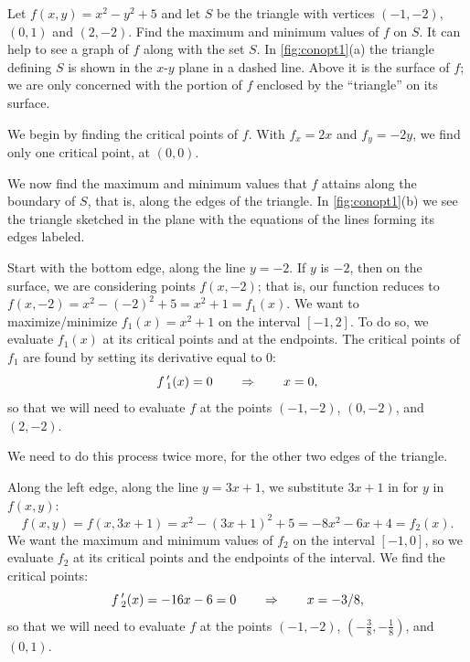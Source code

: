\begin{example}\label{ex_conopt1}%
Let $f(x,y) = x^2-y^2+5$ and let $S$ be the triangle with vertices $(-1,-2)$, $(0,1)$ and $(2,-2)$. Find the maximum and minimum values of $f$ on $S$.
\solution
It can help to see a graph of $f$ along with the set $S$. In \autoref{fig:conopt1}(a) the triangle defining $S$ is shown in the $x$-$y$ plane in a dashed line. Above it is the surface of $f$; we are only concerned with the portion of $f$ enclosed by the ``triangle'' on its surface. 

We begin by finding the critical points of $f$. With $f_x = 2x$ and $f_y = -2y$, we find only one critical point, at $(0,0)$. 

We now find the maximum and minimum values that $f$ attains along the boundary of $S$, that is, along the edges of the triangle. In \autoref{fig:conopt1}(b) we see the triangle sketched in the plane with the equations of the lines forming its edges labeled. 

Start with the bottom edge, along the line $y=-2$. If $y$ is $-2$, then on the surface, we are considering points $f(x,-2)$; that is, our function reduces to $f(x,-2) = x^2-(-2)^2+5 = x^2+1=f_1(x)$. We want to maximize/minimize $f_1(x)=x^2+1$ on the interval $[-1,2]$. To do so, we evaluate $f_1(x)$ at its critical points and at the endpoints.  The critical points of $f_1$ are found by setting its derivative equal to 0:
\[f\,'_1(x)=0\qquad \Rightarrow\qquad x=0,\]
so that we will need to evaluate $f$ at the points $(-1,-2)$, $(0,-2)$, and $(2,-2)$.

We need to do this process twice more, for the other two edges of the triangle.

Along the left edge, along the line $y=3x+1$, we substitute $3x+1$ in for $y$ in $f(x,y)$:
\[f(x,y) = f(x,3x+1) = x^2-(3x+1)^2+5 = -8x^2-6x+4 = f_2(x).\]
We want the maximum and minimum values of $f_2$ on the interval $[-1,0]$, so we evaluate $f_2$ at its critical points and the endpoints of the interval. We find the critical points:
\[f\,'_2(x) = -16x-6=0 \qquad \Rightarrow \qquad x=-3/8,\]
so that we will need to evaluate $f$ at the points $(-1,-2)$, $(-\frac38,-\frac18)$, and $(0,1)$.


\end{example}
